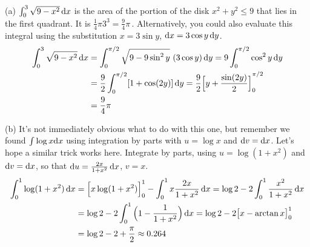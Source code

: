 \begin{solution}
\noindent (a)
$\int_0^3\sqrt{9-x^2}\,\mathrm{d}x$ is the area of the portion of the
disk $x^2+y^2\le 9$ that lies in the first quadrant. It is
$\frac{1}{4}\pi 3^3={\frac{9}{4}\pi}\,$. Alternatively,
you could also evaluate this integral using the substitution
$x=3\sin y$, $\mathrm{d}x=3\cos y\,\mathrm{d}y$.
\begin{align*}
\int_0^3\sqrt{9-x^2}\,\mathrm{d}x
&=\int_0^{\pi/2}\sqrt{9-9\sin^2y}\ (3\cos y)\,\mathrm{d}y
=9\int_0^{\pi/2}\cos^2 y\,\mathrm{d}y \\
&=\frac{9}{2}\int_0^{\pi/2}[1+\cos(2y)]\,\mathrm{d}y
=\frac{9}{2}{\Big[y+\frac{\sin(2y)}{2}\Big]}_0^{\pi/2} \\
&=\frac{9}{4}\pi
\end{align*}

\begin{center}
\end{center}

\noindent (b) It's not immediately obvious what to do with this one, but remember we found $\int \log x \mathrm{d}x$ using integration by parts with $u=\log x$ and $\mathrm{d}v=\mathrm{d}x$. Let's hope a similar trick works here.
 Integrate by parts, using $u=\log(1+x^2)$ and $\mathrm{d}v=\mathrm{d}x$, so that
$\mathrm{d}u=\frac{2x}{1+x^2}\,\mathrm{d}x$, $v=x$.
\begin{align*}
\int_0^1\log(1+x^2)\,\mathrm{d}x
&=\Big[x\log(1+x^2)\Big]_0^1-\int_0^1 x\frac{2x}{1+x^2}\,\mathrm{d}x
=\log 2-2\int_0^1 \frac{x^2}{1+x^2}\,\mathrm{d}x \\
&=\log 2-2\int_0^1\Big(1- \frac{1}{1+x^2}\Big)\,\mathrm{d}x
=\log 2-2\big[x-\arctan x\big]_0^1 \\
&=\log 2-2+\frac{\pi}{2}\approx 0.264
\end{align*}


\end{solution}

